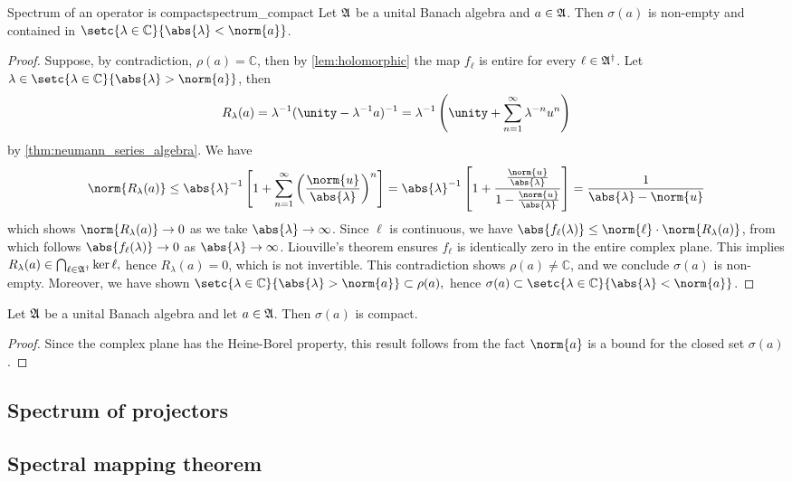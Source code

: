 \begin{theorem}{Spectrum of an operator is compact}{spectrum_compact}
    Let \(\mathfrak{A}\) be a unital Banach algebra and \(a \in \mathfrak{A}\). Then \(\sigma(a)\) is non-empty and contained in \(\setc{\lambda \in \mathbb{C}}{\abs{\lambda} < \norm{a}}\).
\end{theorem}
\begin{proof}
    Suppose, by contradiction, \(\rho(a) = \mathbb{C}\), then by \cref{lem:holomorphic} the map \(f_\ell\) is entire for every \(\ell \in \mathfrak{A}^\dag\). Let \(\lambda \in \setc{\lambda \in \mathbb{C}}{\abs{\lambda} > \norm{a}}\), then
    \begin{equation*}
        R_{\lambda}(a) = \lambda^{-1}(\unity - \lambda^{-1}a)^{-1} = \lambda^{-1}\left(\unity + \sum_{n = 1}^{\infty} \lambda^{-n}u^n\right)
    \end{equation*}
    by \cref{thm:neumann_series_algebra}. We have
    \begin{equation*}
        \norm{R_{\lambda}(a)} \leq \abs{\lambda}^{-1}\left[1 + \sum_{n = 1}^\infty \left(\frac{\norm{u}}{\abs{\lambda}}\right)^n\right] = \abs{\lambda}^{-1} \left[1 + \frac{\frac{\norm{u}}{\abs{\lambda}}}{1 - \frac{\norm{u}}{\abs{\lambda}}}\right] = \frac{1}{\abs{\lambda} - \norm{u}}
    \end{equation*}
    which shows \(\norm{R_{\lambda}(a)} \to 0\) as we take \(\abs{\lambda} \to \infty\). Since \(\ell\) is continuous, we have \(\abs{f_\ell(\lambda)} \leq \norm{\ell}\cdot \norm{R_{\lambda}(a)}\), from which follows \(\abs{f_\ell(\lambda)} \to 0\) as \(\abs{\lambda} \to \infty\). Liouville's theorem ensures \(f_\ell\) is identically zero in the entire complex plane. This implies \(R_\lambda(a) \in \bigcap_{\ell \in \mathfrak{A}^\dag}\ker{\ell},\) hence \(R_{\lambda}(a) = 0\), which is not invertible. This contradiction shows \(\rho(a) \neq \mathbb{C}\), and we conclude \(\sigma(a)\) is non-empty. Moreover, we have shown \(\setc{\lambda \in \mathbb{C}}{\abs{\lambda} > \norm{a}} \subset \rho(a),\) hence \(\sigma(a) \subset \setc{\lambda \in \mathbb{C}}{\abs{\lambda} < \norm{a}}\).
\end{proof}
\begin{corollary}
    Let \(\mathfrak{A}\) be a unital Banach algebra and let \(a \in \mathfrak{A}\). Then \(\sigma(a)\) is compact.
\end{corollary}
\begin{proof}
    Since the complex plane has the Heine-Borel property, this result follows from the fact \(\norm{a}\) is a bound for the closed set \(\sigma(a)\).
\end{proof}

\subsection{Spectrum of projectors}
\subsection{Spectral mapping theorem}
